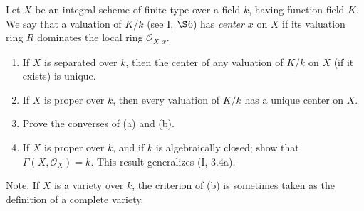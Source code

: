 \begin{exercise}
	Let $X$ be an integral scheme of finite type over a field $k$, having function field $K$. We say that a valuation of $K/k$ (see I, $\S $6) has \textit{center} $x$ on $X$ if its valuation ring $R$ dominates the local ring $\mathcal{O}_{X,x} $.
	\begin{enumerate}
		\item If $X$ is separated over $k$, then the center of any valuation of $K/k$ on $X$ (if it exists) is unique.
		\item If $X$ is proper over $k $, then every valuation of $K/k$ has a unique center on $X$.
		\item Prove the converses of (a) and (b).
			\fi
		\item If $X$ is proper over $k$, and if $k$ is algebraically closed; show that $\Gamma(X,\mathcal{O}_X) = k $. This result generalizes (I, 3.4a).
			\fi
	\end{enumerate}
Note. If $X$ is a variety over $k$, the criterion of (b) is sometimes taken as the definition of a complete variety.
\end{exercise}
